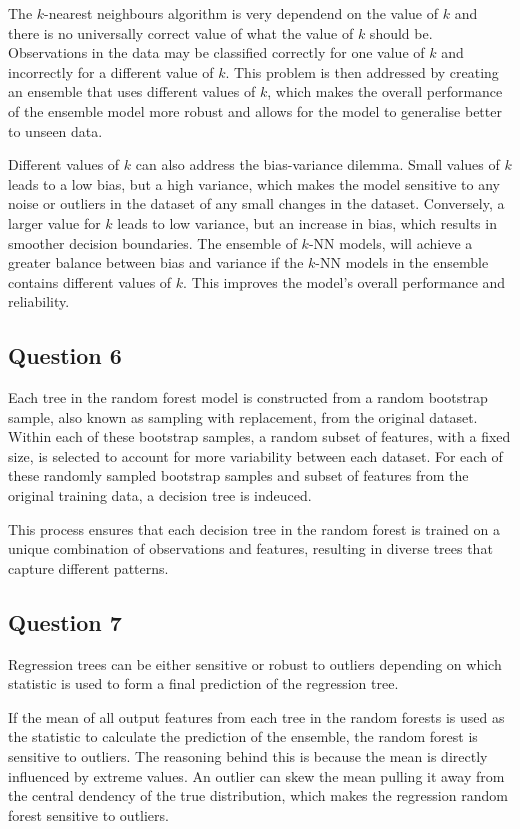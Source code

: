 \documentclass[10pt]{article}
\begin{document}
The $k$-nearest neighbours algorithm is very dependend on the value of $k$ and there is no universally correct
value of what the value of $k$ should be. Observations in the data may be classified correctly for one value
of $k$ and incorrectly for a different value of $k$. This problem is then addressed by creating an ensemble that
uses different values of $k$, which makes the overall performance of the ensemble model more robust and allows for
the model to generalise better to unseen data.

Different values of $k$ can also address the bias-variance dilemma. Small values of $k$ leads to a low bias,
but a high variance, which makes the model sensitive to any noise or outliers in the dataset of any small
changes in the dataset. Conversely, a larger value for $k$ leads to low variance, but an increase in bias,
which results in smoother decision boundaries. The ensemble of $k$-NN models, will achieve a greater balance
between bias and variance if the $k$-NN models in the ensemble contains different values of $k$. This improves the
model's overall performance and reliability.

\subsection*{Question 6}

Each tree in the random forest model is constructed from a random bootstrap sample, also known as sampling with
replacement, from the original dataset. Within each of these bootstrap samples, a random subset of features, with a
fixed size, is selected to account for more variability between each dataset. For each of these randomly sampled
bootstrap samples and subset of features from the original training data, a decision tree is indeuced.

This process ensures that each decision tree in the random forest is trained on a unique combination of
observations and features, resulting in diverse trees that capture different patterns.

\subsection*{Question 7}

Regression trees can be either sensitive or robust to outliers depending on which statistic is used to form a final
prediction of the regression tree.

If the mean of all output features from each tree in the random forests
is used as the statistic to calculate the prediction of the ensemble, the random forest is sensitive to outliers. The
reasoning behind this is because the mean is directly influenced by extreme values. An outlier can skew the mean pulling it
away from the central dendency of the true distribution, which makes the regression random forest sensitive to outliers.
\end{document}
